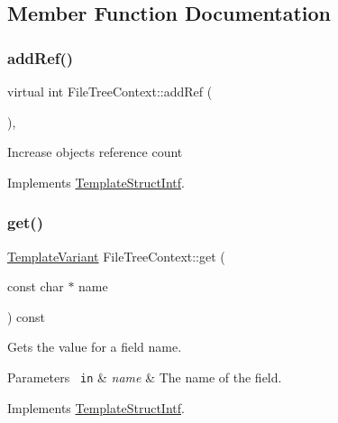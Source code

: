 \subsection{Member Function Documentation}
\mbox{\label{class_file_tree_context_a01aadccccf538d37ddfea3d4c4149e1f}} 
\subsubsection{\texorpdfstring{addRef()}{addRef()}}
{\footnotesize\ttfamily virtual int File\+Tree\+Context\+::add\+Ref (\begin{DoxyParamCaption}{ }\end{DoxyParamCaption})\hspace{0.3cm}{\ttfamily [inline]}, {\ttfamily [virtual]}}

Increase object\textquotesingle{}s reference count 

Implements \mbox{\hyperlink{class_template_struct_intf_a05fe97ad47633beb326f69686faed581}{Template\+Struct\+Intf}}.

\mbox{\label{class_file_tree_context_a6809056d3dc7adac668e0d28dd2575f5}} 
\subsubsection{\texorpdfstring{get()}{get()}}
{\footnotesize\ttfamily \mbox{\hyperlink{class_template_variant}{Template\+Variant}} File\+Tree\+Context\+::get (\begin{DoxyParamCaption}\item[{const char $\ast$}]{name }\end{DoxyParamCaption}) const\hspace{0.3cm}{\ttfamily [virtual]}}

Gets the value for a field name. 
\begin{DoxyParams}[1]{Parameters}
\mbox{\texttt{ in}}  & {\em name} & The name of the field. \\
\hline
\end{DoxyParams}


Implements \mbox{\hyperlink{class_template_struct_intf_a3d610cb81b4adbb531ebed3aa3d09b51}{Template\+Struct\+Intf}}.

